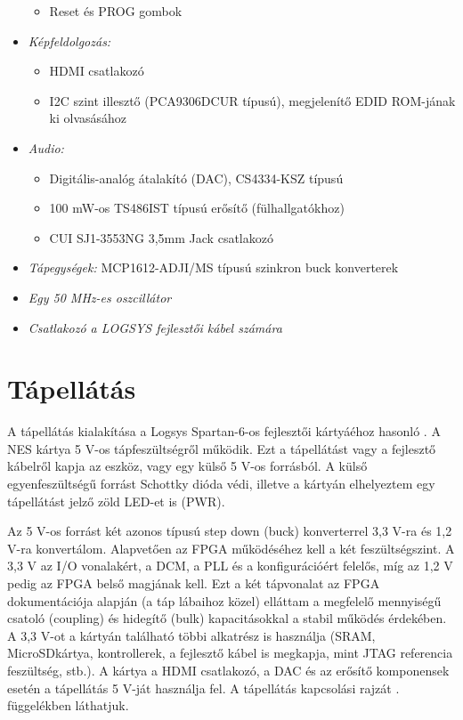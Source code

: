 \begin{itemize}
\begin{itemize}
			\item Reset és PROG gombok
		\end{itemize}	
	\item \emph{Képfeldolgozás:}
		\begin{itemize}
			\item HDMI csatlakozó 
			\item I2C szint illesztő (PCA9306DCUR típusú), megjelenítő EDID ROM-jának ki olvasásához 
		\end{itemize}
	\item \emph{Audio:}
		\begin{itemize}
			\item Digitális-analóg átalakító (DAC), CS4334-KSZ típusú  
			\item 100 mW-os TS486IST típusú erősítő (fülhallgatókhoz)
			\item CUI SJ1-3553NG 3,5mm Jack csatlakozó
		\end{itemize}
	\item \emph{Tápegységek:} MCP1612-ADJI/MS típusú szinkron buck konverterek
	\item \emph{Egy 50 MHz-es oszcillátor} 
	\item \emph{Csatlakozó a LOGSYS fejlesztői kábel számára} 
\end{itemize}
	
\section{Tápellátás}
	
	A tápellátás kialakítása a Logsys Spartan-6-os fejlesztői kártyáéhoz hasonló \cite{spatan6}. A NES kártya 5 V-os tápfeszültségről működik. Ezt a tápellátást vagy a fejlesztő kábelről kapja az eszköz, vagy egy külső 5 V-os forrásból. A külső egyenfeszültségű forrást Schottky dióda védi, illetve a kártyán elhelyeztem egy tápellátást jelző zöld LED-et is (PWR). 
	
	Az 5 V-os forrást két azonos típusú step down (buck) konverterrel 3,3 V-ra és 1,2 V-ra konvertálom. Alapvetően az FPGA működéséhez kell a két feszültségszint. A 3,3 V az I/O vonalakért, a DCM, a PLL és a konfigurációért felelős, míg az 1,2 V pedig az FPGA belső magjának kell. Ezt a két tápvonalat az FPGA dokumentációja alapján (a táp lábaihoz közel) elláttam a megfelelő mennyiségű csatoló (coupling) és hidegítő (bulk) kapacitásokkal a stabil működés érdekében. A 3,3 V-ot a kártyán található többi alkatrész is használja (SRAM, MicroSDkártya, kontrollerek, a fejlesztő kábel is megkapja, mint JTAG referencia feszültség, stb.). A kártya a HDMI csatlakozó, a DAC és az erősítő komponensek esetén a tápellátás 5 V-ját használja fel. A tápellátás kapcsolási rajzát . függelékben láthatjuk. 
	 
